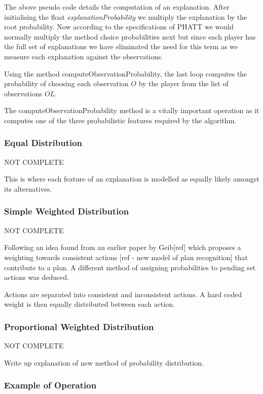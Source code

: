 \documentclass[parskip]{cs4rep}
\begin{document}
The above pseudo code details the computation of an explanation. After initialising the float \textit{explanationProbability} we multiply the explanation by the root probability. Now according to the specifications of PHATT we would normally multiply the method choice probabilities next but since each player has the full set of explanations we have eliminated the need for this term as we measure each explanation against the observations.

Using the method computeObservationProbability, the last loop computes the probability of choosing each observation $O$ by the player from the list of observations $OL$.

The computeObservationProbability method is a vitally important operation as it computes one of the three probabilistic features required by the algorithm.

\subsubsection{Equal Distribution}

NOT COMPLETE

This is where each feature of an explanation is modelled as equally likely amongst its alternatives. 

\subsubsection{Simple Weighted Distribution}

NOT COMPLETE

Following an idea found from an earlier paper by Geib[ref] which proposes a weighting towards consistent actions [ref - new model of plan recognition] that contribute to a plan. A different method of assigning probabilities to pending set actions was deduced.

Actions are separated into consistent and inconsistent actions. A hard coded weight is then equally distributed between each action.

\subsubsection{Proportional Weighted Distribution}

NOT COMPLETE

Write up explanation of new method of probability distribution.

\subsubsection{Example of Operation}
\end{document}
